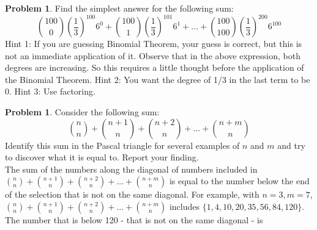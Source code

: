 \documentclass[10pt,leqno ]{article}
\theoremstyle{definition}
\newtheorem{problem}[theorem]{Problem}
\begin{document}
\begin{problem} Find the simplest answer for the following sum: 
$${100 \choose 0} \left(\dfrac{1}{3} \right)^{100} 6^0 + {100 \choose 1} \left(\dfrac{1}{3} \right)^{101} 6^1+. . .+{100 \choose 100} \left(\dfrac{1}{3} \right)^{200} 6^{100}$$
Hint 1:  If you are guessing Binomial Theorem, your guess is correct, but this  is  not  an  immediate  application  of  it.   Observe  that  in  the  above expression, both degrees are increasing.  So this requires a little thought before the application of the Binomial Theorem.  Hint 2:  You want the degree of 1/3 in the last term to be 0.  Hint 3:  Use factoring.
\\
\Large
\end{problem}
\newpage

\begin{problem} Consider the following sum:
$${n \choose n}+ {n+ 1 \choose n}+ {n+ 2 \choose n}+. . .+{n+m \choose n}$$
Identify this sum in the Pascal triangle for several examples of $n$ and $m$ and try to discover what it is equal to.  Report your finding.
\\
\Large
The sum of the numbers along the diagonal of numbers included in ${n \choose n}+ {n+ 1 \choose n}+ {n+ 2 \choose n}+. . .+{n+m \choose n}$ is equal to the number below the end of the selection that is not on the same diagonal.  For example, with $n=3, m=7$, ${n \choose n}+ {n+ 1 \choose n}+ {n+ 2 \choose n}+. . .+{n+m \choose n}$ includes $\{1, 4, 10, 20, 35, 56, 84, 120\}$.  The number that is below 120 - that is not on the same diagonal - is 
\end{problem}
\newpage
\end{document}
